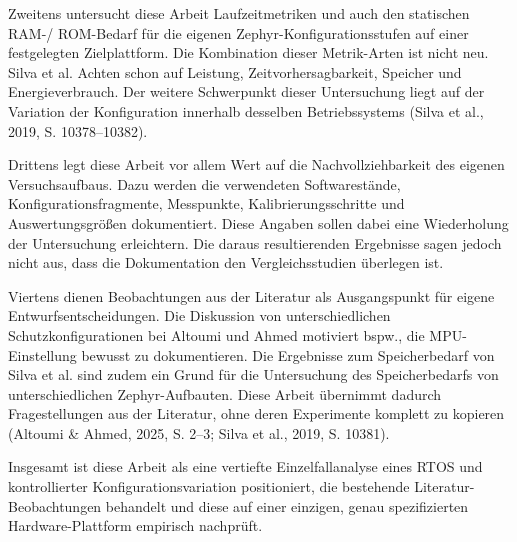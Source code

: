 Zweitens untersucht diese Arbeit Laufzeitmetriken und auch den statischen RAM-/ ROM-Bedarf f{\"u}r die eigenen Zephyr-Konfigurationsstufen auf einer festgelegten Zielplattform. Die Kombination dieser Metrik-Arten ist nicht neu. Silva et al. Achten schon auf Leistung, Zeitvorhersagbarkeit, Speicher und Energieverbrauch. Der weitere Schwerpunkt dieser Untersuchung liegt auf der Variation der Konfiguration innerhalb desselben Betriebssystems (Silva et al., 2019, S. 10378--10382).

Drittens legt diese Arbeit vor allem Wert auf die Nachvollziehbarkeit des eigenen Versuchsaufbaus. Dazu werden die verwendeten Softwarest{\"a}nde, Konfigurationsfragmente, Messpunkte, Kalibrierungsschritte und Auswertungsgr{\"o}{\ss}en dokumentiert. Diese Angaben sollen dabei eine Wiederholung der Untersuchung erleichtern. Die daraus resultierenden Ergebnisse sagen jedoch nicht aus, dass die Dokumentation den Vergleichsstudien {\"u}berlegen ist.

Viertens dienen Beobachtungen aus der Literatur als Ausgangspunkt f{\"u}r eigene Entwurfsentscheidungen. Die Diskussion von unterschiedlichen Schutzkonfigurationen bei Altoumi und Ahmed motiviert bspw., die MPU-Einstellung bewusst zu dokumentieren. Die Ergebnisse zum Speicherbedarf von Silva et al. sind zudem ein Grund f{\"u}r die Untersuchung des Speicherbedarfs von unterschiedlichen Zephyr-Aufbauten. Diese Arbeit {\"u}bernimmt dadurch Fragestellungen aus der Literatur, ohne deren Experimente komplett zu kopieren (Altoumi \& Ahmed, 2025, S. 2--3; Silva et al., 2019, S. 10381).

Insgesamt ist diese Arbeit als eine vertiefte Einzelfallanalyse eines RTOS und kontrollierter Konfigurationsvariation positioniert, die bestehende Literatur-Beobachtungen behandelt und diese auf einer einzigen, genau spezifizierten Hardware-Plattform empirisch nachpr{\"u}ft.
